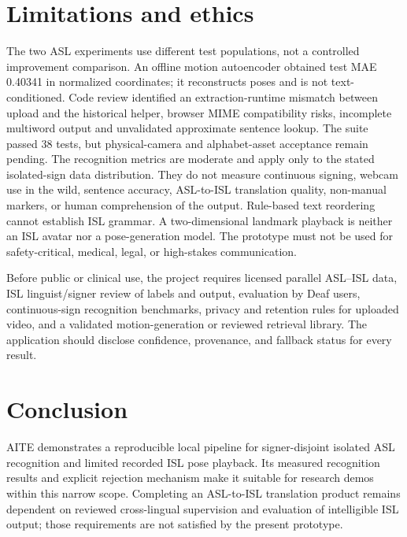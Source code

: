 \documentclass[journal,twocolumn]{IEEEtran}
\begin{document}
\section{Limitations and ethics}
The two ASL experiments use different test populations, not a controlled
improvement comparison. An offline motion autoencoder obtained test MAE 0.40341
in normalized coordinates; it reconstructs poses and is not text-conditioned.
Code review identified an extraction-runtime mismatch between upload and the
historical helper, browser MIME compatibility risks, incomplete multiword output
and unvalidated approximate sentence lookup. The suite passed 38 tests, but
physical-camera and alphabet-asset acceptance remain pending.
The recognition metrics are moderate and apply only to the stated isolated-sign
data distribution. They do not measure continuous signing, webcam use in the
wild, sentence accuracy, ASL-to-ISL translation quality, non-manual markers, or
human comprehension of the output. Rule-based text reordering cannot establish
ISL grammar. A two-dimensional landmark playback is neither an ISL avatar nor a
pose-generation model. The prototype must not be used for safety-critical,
medical, legal, or high-stakes communication.

Before public or clinical use, the project requires licensed parallel
ASL--ISL data, ISL linguist/signer review of labels and output, evaluation by
Deaf users, continuous-sign recognition benchmarks, privacy and retention rules
for uploaded video, and a validated motion-generation or reviewed retrieval
library. The application should disclose confidence, provenance, and fallback
status for every result.

\section{Conclusion}
AITE demonstrates a reproducible local pipeline for signer-disjoint isolated
ASL recognition and limited recorded ISL pose playback. Its measured recognition
results and explicit rejection mechanism make it suitable for research demos
within this narrow scope. Completing an ASL-to-ISL translation product remains
dependent on reviewed cross-lingual supervision and evaluation of intelligible
ISL output; those requirements are not satisfied by the present prototype.



\end{document}
